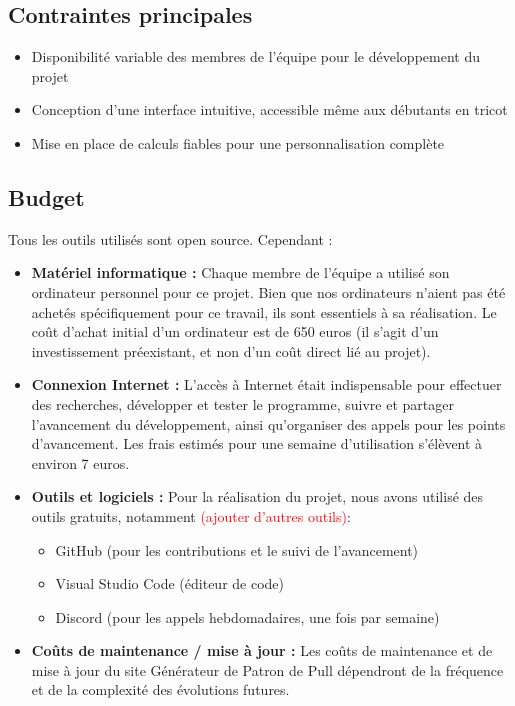 \documentclass{article}
\begin{document}
	
	\subsection*{Contraintes principales}
	\begin{itemize}
		\item Disponibilité variable des membres de l’équipe pour le développement du projet
		\item Conception d’une interface intuitive, accessible même aux débutants en tricot
		\item Mise en place de calculs fiables pour une personnalisation complète
	\end{itemize}

	
	\subsection{Budget}
	
	Tous les outils utilisés sont open source. Cependant :
	
	\begin{itemize}
		\item \textbf{Matériel informatique :}  
		Chaque membre de l’équipe a utilisé son ordinateur personnel pour ce projet. Bien que nos ordinateurs n’aient pas été achetés spécifiquement pour ce travail, ils sont essentiels à sa réalisation. Le coût d'achat initial d'un ordinateur est de 650 euros (il s’agit d’un investissement préexistant, et non d’un coût direct lié au projet).
		
		\item \textbf{Connexion Internet :}  
		L’accès à Internet était indispensable pour effectuer des recherches, développer et tester le programme, suivre et partager l’avancement du développement, ainsi qu’organiser des appels pour les points d’avancement. Les frais estimés pour une semaine d’utilisation s’élèvent à environ 7 euros.
		
		\item \textbf{Outils et logiciels :}  
		Pour la réalisation du projet, nous avons utilisé des outils gratuits, notamment  \textcolor{red}{(ajouter d'autres outils)}:
		\begin{itemize}
			\item GitHub (pour les contributions et le suivi de l’avancement)
			\item Visual Studio Code (éditeur de code)
			\item Discord (pour les appels hebdomadaires, une fois par semaine)
		\end{itemize}
		
		\item \textbf{Coûts de maintenance / mise à jour :}  
		Les coûts de maintenance et de mise à jour du site Générateur de Patron de Pull dépendront de la fréquence et de la complexité des évolutions futures.
		
	\end{itemize}
	
\end{document}
